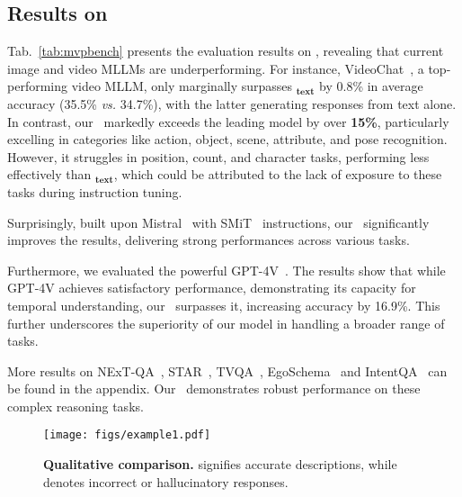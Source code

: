 \subsection{Results on \BenchName}
Tab.~\ref{tab:mvpbench} presents the evaluation results on \BenchName, 
revealing that current image and video MLLMs are underperforming.
For instance, 
VideoChat~\cite{videochat}, a top-performing video MLLM, only marginally surpasses \textbf{\ModelName$_\mathbf{text}$} by 0.8\% in average accuracy (35.5\% \textit{vs.} 34.7\%), 
with the latter generating responses from text alone. 
In contrast, our \textbf{\ModelName}\  markedly exceeds the leading model by over \textbf{15\%}, 
particularly excelling in categories like action, object, scene, attribute, and pose recognition.
However, 
it struggles in position, count, and character tasks,
performing less effectively than \ModelName$_\mathbf{text}$,
which could be attributed to the lack of exposure to these tasks during instruction tuning.

Surprisingly,
built upon Mistral~\cite{mistral} with SMiT~\cite{smit} instructions,
our \ModelName\ significantly improves the results,
delivering strong performances across various tasks. 

Furthermore, we evaluated the powerful GPT-4V~\cite{gpt4v}. 
The results show that while GPT-4V achieves satisfactory performance, 
demonstrating its capacity for temporal understanding, 
our \ModelName\ surpasses it, 
increasing accuracy by 16.9\%. 
This further underscores the superiority of our model in handling a broader range of tasks.

More results on NExT-QA~\cite{nextqa}, STAR~\cite{star}, TVQA~\cite{tvqa}, EgoSchema~\cite{egoschema} and IntentQA~\cite{intentqa} can be found in the appendix.
Our \ModelName\ demonstrates robust performance on these complex reasoning tasks.

\begin{figure}[t]
    \centering
    \vspace{-0.2cm}
    \texttt{[image: figs/example1.pdf]}
    \vspace{-0.35cm}
    \caption{
    \textbf{Qualitative comparison.}
     signifies accurate descriptions, while  denotes incorrect or hallucinatory responses.
    }
    \label{fig:example1}
    \vspace{-0.3cm}
\end{figure}


